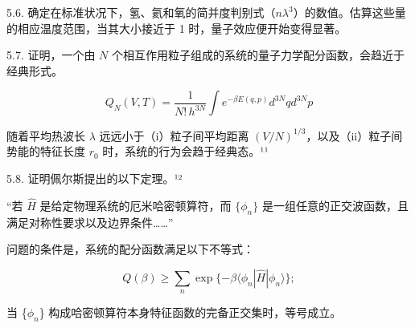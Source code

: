 5.6. 确定在标准状况下，氢、氦和氧的简并度判别式（\(n\lambda^{3}\)）的数值。估算这些量的相应温度范围，当其大小接近于 1 时，量子效应便开始变得显著。

5.7. 证明，一个由 \(N\) 个相互作用粒子组成的系统的量子力学配分函数，会趋近于经典形式。

\begin{equation}\tag{5.4.50}\label{eq:5.4.50}
Q _ { N } ( V , T ) = \frac { 1 } { N ! \, h ^{3 N} } \int e ^{- \beta E ( q , p )} d ^{3 N} q d ^{3 N} p
\end{equation}

随着平均热波长 \(\lambda\) 远远小于（i）粒子间平均距离 \((V/N)^{1/3}\)，以及（ii）粒子间势能的特征长度 \(r_0\) 时，系统的行为会趋于经典态。¹¹

5.8. 证明佩尔斯提出的以下定理。¹²

``若 \(\hat{H}\) 是给定物理系统的厄米哈密顿算符，而 \(\{\phi_{n}\}\) 是一组任意的正交波函数，且满足对称性要求以及边界条件\ldots\ldots{}''

问题的条件是，系统的配分函数满足以下不等式：

\begin{equation}\tag{5.4.51}\label{eq:5.4.51}
Q ( \beta ) \geq \sum _ { n } \exp \{ - \beta \langle \phi _ { n } | \hat { H } | \phi _ { n } \rangle \} ;
\end{equation}

当 \{\(\phi_{n}\)\} 构成哈密顿算符本身特征函数的完备正交集时，等号成立。


